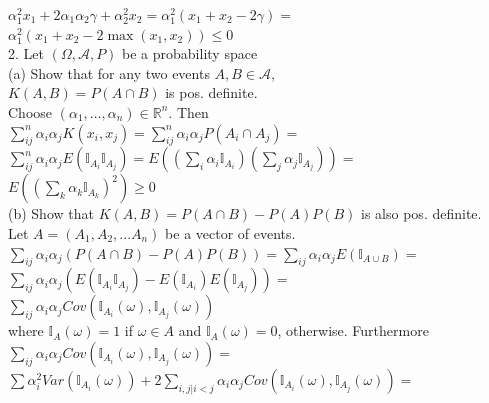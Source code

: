 \documentclass[18pt]{article}
\begin{document}
    \begin{flushleft}
    $\alpha_1^2 x_1 + 2 \alpha_1 \alpha_2 \gamma + \alpha_2^2 x_2 = \alpha_1^2 (x_1 + x_2 -2\gamma)=$\\
    $\alpha_1^2(x_1+x_2-2 \max(x_1,x_2)) \leq 0$\\
\vspace{.4cm}
2. Let $(\Omega,\mathcal{A}, P)$ be a probability space\\
\vspace{.4cm}
(a) Show that for any two events $A,B\in \mathcal{A}$,\\
$K(A,B)=P(A \cap B)$ is pos. definite.\\
\vspace{.4cm}
Choose $(\alpha_1,\dots,\alpha_n) \in \mathbb{R}^n$. Then\\
\vspace{.4cm}
$\sum_{ij}^n \alpha_i \alpha_j K(x_i,x_j)=\sum_{ij}^n \alpha_i \alpha_j P(A_i \cap A_j)=$\\
$\sum_{ij}^n \alpha_i \alpha_j E(\mathbb{I}_{A_i} \mathbb{I}_{A_j})=E\left( \left(\sum_i \alpha_i \mathbb{I}_{A_i}\right)\left(\sum_j \alpha_j \mathbb{I}_{A_j}\right)\right)=$\\
$E\left( \left(\sum_k \alpha_k \mathbb{I}_{A_k} \right)^2 \right) \geq 0$\\
\vspace{.4cm}
(b) Show that $K(A,B)=P(A \cap B)- P(A)P(B)$ is also pos. definite.\\
\vspace{.4cm}
Let $A=(A_1, A_2, ... A_n)$ be a vector of events.
$\sum_{ij} \alpha_i \alpha_j\left( P(A \cap B)- P(A)P(B)\right) =\sum_{ij} \alpha_i \alpha_j E(\mathbb{I}_{A \cup  B})=$\\
$\sum_{ij} \alpha_i \alpha_j \left(E(\mathbb{I}_{A_i} \mathbb{I}_{A_j} )- E(\mathbb{I}_{A_i}) E(\mathbb{I}_{A_j})\right)=$\\
$\sum_{ij} \alpha_i \alpha_j Cov \left(\mathbb{I}_{A_i}(\omega),\mathbb{I}_{A_j}(\omega)\right)$\\
\vspace{.4cm}
where $\mathbb{I}_{A}(\omega)=1$ if $\omega\in A$ and $\mathbb{I}_{A}(\omega)= 0$, otherwise. Furthermore\\
\vspace{.4cm}
$\sum_{ij} \alpha_i \alpha_j Cov \left(\mathbb{I}_{A_i}(\omega),\mathbb{I}_{A_j}(\omega)\right)=$\\
$\sum \alpha_i^2 Var(\mathbb{I}_{A_i}(\omega))+2 \sum_{i,j|i<j} \alpha_i \alpha_j Cov\left(\mathbb{I}_{A_i}(\omega),\mathbb{I}_{A_j}(\omega)\right)=$\\

\end{flushleft}
\end{document}
